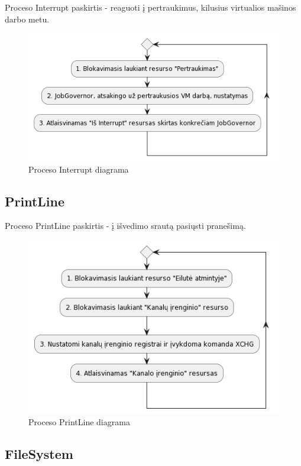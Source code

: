 \documentclass{VUMIFInfKursinis}
\begin{document}
Proceso Interrupt paskirtis - reaguoti į pertraukimus, kilusius virtualios mašinos darbo metu.

\begin{figure}[H]
	\centering	
	\includegraphics[scale=0.65]{img/Interrupt}
	\caption{Proceso Interrupt diagrama}   %
	\label{img:Interrupt}
\end{figure}

\subsection{PrintLine}

Proceso PrintLine paskirtis - į išvedimo srautą pasiųsti pranešimą.

\begin{figure}[H]
	\centering	
	\includegraphics[scale=0.65]{img/PrintLine}
	\caption{Proceso PrintLine diagrama}   %
	\label{img:PrintLine}
\end{figure}

\subsection{FileSystem}
\end{document}
